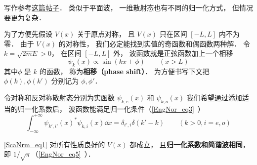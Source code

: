 
写作参考\href{https://chaoli.club/index.php/4541/last}{这篇帖子}． 类似于平面波， 一维散射态也有不同的归一化方式， 但情况要更为复杂． 

为了方便先假设 $V(x)$ 关于原点对称， 且 $V(x)$ 只在区间 $[-L,L]$ 内不为零． 由于 $V(x)$ 的对称性， 我们必定能找到实值的奇函数和偶函数两种解． 令 $k = \sqrt{2mE} > 0$， 在区间 $[-L,L]$ 外， 波函数就是正弦函数加上一个相移
\begin{equation}
\psi_k(x) \propto \sin(kx + \phi) \qquad (x > L)
\end{equation}
其中$\phi$ 是 $k$ 的函数， 称为\textbf{相移（phase shift）}． 为方便书写下文把 $\phi(k),\phi(k')$ 分别记为 $\phi, \phi'$．

令对称和反对称散射态分别为实函数 $\psi_{k,e}(x)$ 和 $\psi_{k,o}(x)$ 我们希望通过添加适当的归一化系数后， 波函数能满足归一化条件（\autoref{EngNor_eq3}~）%
\begin{equation}\label{ScaNrm_eq1}
\int_{-\infty}^{+\infty} \psi_{k',i'}(x)^* \psi_{k,i}(x) \dd{x} = \delta_{i',i}\delta(k' - k) \qquad (k > 0, i = e, o)
\end{equation}

\begin{theorem}{}
\autoref{ScaNrm_eq1} 对所有性质良好的 $V(x)$ 都成立， 且\textbf{归一化系数和简谐波相同}， 即 $1/\sqrt{\pi}$（\autoref{EngNor_eq5}~）．
\end{theorem}

